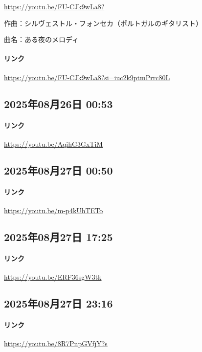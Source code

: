 \url{https://youtu.be/FU-CJk9wLa8?}

作曲：シルヴェストル・フォンセカ（ポルトガルのギタリスト）

曲名：ある夜のメロディ

\paragraph{リンク}
\url{https://youtu.be/FU-CJk9wLa8?si=iuc2k9ptmPrrc80L}

\subsection*{2025年08月26日 00:53}

\paragraph{リンク}
\url{https://youtu.be/AqihG3GxTiM}

\subsection*{2025年08月27日 00:50}

\paragraph{リンク}
\url{https://youtu.be/m-p4kUhTETo}

\subsection*{2025年08月27日 17:25}

\paragraph{リンク}
\url{https://youtu.be/ERF36sgW3tk}

\subsection*{2025年08月27日 23:16}

\paragraph{リンク}
\url{https://youtu.be/8R7PnpGVfjY?s}

